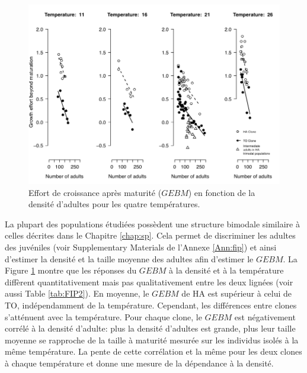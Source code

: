 \begin{figure}[!ht]
\begin{center}
\includegraphics[width=\textwidth]{1_CorpsDeThese/Resumes/Fig/FIP05}
\caption[GEBM]{Effort de croissance
après maturité ($GEBM$) en fonction de la densité d'adultes pour les quatre
températures. }
\label{fig:FIP5}
\end{center}
\end{figure}

La plupart des populations étudiées possèdent une structure bimodale similaire à
celles décrites dans le Chapitre \ref{chap:sp}. Cela permet de discriminer les
adultes des juvéniles (voir Supplementary Materials de l'Annexe \ref{Ann:fip})
et ainsi d'estimer la densité et la taille moyenne des adultes afin d'estimer le
$GEBM$. La Figure \ref{fig:FIP5} montre que les réponses du $GEBM$ à la
densité et à la température diffèrent quantitativement mais pas qualitativement
entre les deux lignées (voir aussi Table \ref{tab:FIP2}). En moyenne, le $GEBM$
de HA est supérieur à celui de TO, indépendamment de la température. Cependant,
les différences entre clones s'atténuent avec la température. Pour chaque clone,
le $GEBM$ est négativement corrélé à la densité d'adulte: plus la densité
d'adultes est grande, plus leur taille moyenne se rapproche de la taille à
maturité mesurée sur les individus isolés à la même température. La pente de
cette corrélation et la même pour les deux clones à chaque température et donne
une mesure de la dépendance à la densité. 

